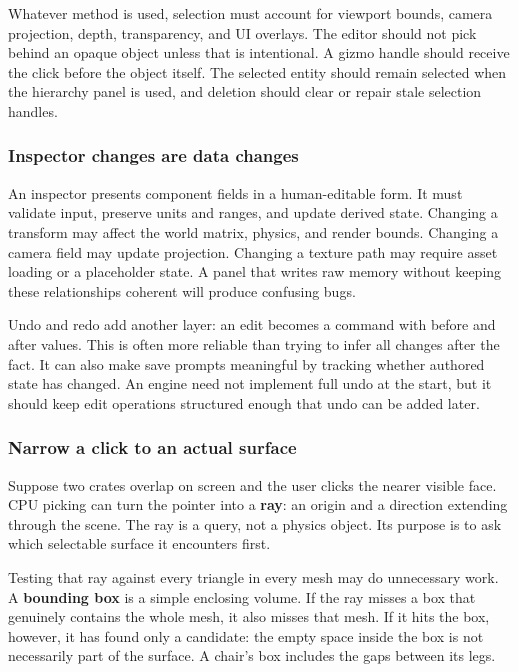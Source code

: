 Whatever method is used, selection must account for viewport bounds, camera projection, depth, transparency, and UI overlays. The editor should not pick behind an opaque object unless that is intentional. A gizmo handle should receive the click before the object itself. The selected entity should remain selected when the hierarchy panel is used, and deletion should clear or repair stale selection handles.

\subsubsection{Inspector changes are data changes}\label{06-engine-ii-ch032-inspector-changes-are-data-changes}

An inspector presents component fields in a human-editable form. It must validate input, preserve units and ranges, and update derived state. Changing a transform may affect the world matrix, physics, and render bounds. Changing a camera field may update projection. Changing a texture path may require asset loading or a placeholder state. A panel that writes raw memory without keeping these relationships coherent will produce confusing bugs.

Undo and redo add another layer: an edit becomes a command with before and after values. This is often more reliable than trying to infer all changes after the fact. It can also make save prompts meaningful by tracking whether authored state has changed. An engine need not implement full undo at the start, but it should keep edit operations structured enough that undo can be added later.

\subsubsection{Narrow a click to an actual surface}\label{06-engine-ii-ch032-narrow-a-click-to-an-actual-surface}

Suppose two crates overlap on screen and the user clicks the nearer visible face. CPU picking can turn the pointer into a \textbf{ray}: an origin and a direction extending through the scene. The ray is a query, not a physics object. Its purpose is to ask which selectable surface it encounters first.

Testing that ray against every triangle in every mesh may do unnecessary work. A \textbf{bounding box} is a simple enclosing volume. If the ray misses a box that genuinely contains the whole mesh, it also misses that mesh. If it hits the box, however, it has found only a candidate: the empty space inside the box is not necessarily part of the surface. A chair's box includes the gaps between its legs.

